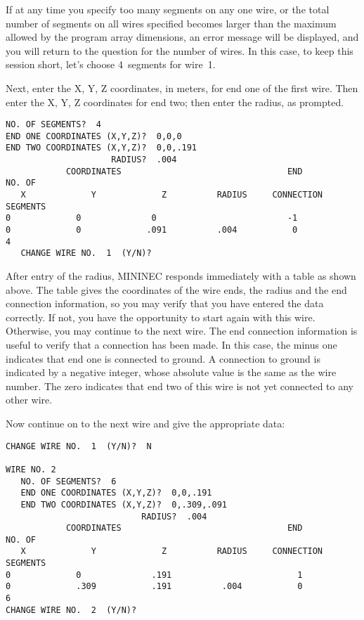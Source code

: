 \documentclass[12pt]{article}
\begin{document}
If at any time you specify too many segments on any one wire, or the
total number of segments on all wires specified becomes larger than the
maximum allowed by the program array dimensions, an error message will
be displayed, and you will return to the question for the number of
wires. In this case, to keep this session short, let's choose 4~segments
for wire~1.

Next, enter the X, Y, Z coordinates, in meters, for end one of the first
wire. Then enter the X, Y, Z coordinates for end two; then enter the
radius, as prompted.

\begin{Verbatim}
NO. OF SEGMENTS?  4
END ONE COORDINATES (X,Y,Z)?  0,0,0
END TWO COORDINATES (X,Y,Z)?  0,0,.191
                     RADIUS?  .004
            COORDINATES                                 END         NO. OF
   X             Y             Z          RADIUS     CONNECTION     SEGMENTS
0             0              0                          -1
0             0             .091          .004           0             4
   CHANGE WIRE NO.  1  (Y/N)?
\end{Verbatim}

After entry of the radius, MININEC responds immediately with a table as
shown above. The table gives the coordinates of the wire ends, the
radius and the end connection information, so you may verify that you
have entered the data correctly. If not, you have the opportunity to
start again with this wire. Otherwise, you may continue to the next
wire. The end connection information is useful to verify that a
connection has been made. In this case, the minus one indicates that end
one is connected to ground. A connection to ground is indicated by a
negative integer, whose absolute value is the same as the wire number.
The zero indicates that end two of this wire is not yet connected to any
other wire.

Now continue on to the next wire and give the appropriate data:

\begin{Verbatim}
CHANGE WIRE NO.  1  (Y/N)?  N

WIRE NO. 2
   NO. OF SEGMENTS?  6
   END ONE COORDINATES (X,Y,Z)?  0,0,.191
   END TWO COORDINATES (X,Y,Z)?  0,.309,.091
                           RADIUS?  .004
            COORDINATES                                 END         NO. OF
   X             Y             Z          RADIUS     CONNECTION     SEGMENTS
0             0              .191                         1
0             .309           .191          .004           0            6
CHANGE WIRE NO.  2  (Y/N)?
\end{Verbatim}
\end{document}
